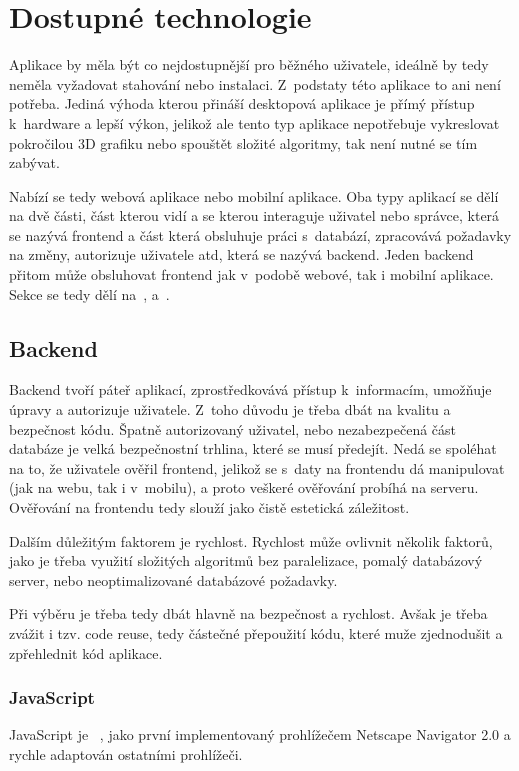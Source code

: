 \section{Dostupné technologie}
\label{sc:available_technologies}
Aplikace by měla být co nejdostupnější pro běžného uživatele, ideálně by tedy neměla vyžadovat stahování nebo instalaci. Z~podstaty této aplikace to ani není potřeba. Jediná výhoda kterou přináší desktopová aplikace je přímý přístup k~hardware a lepší výkon, jelikož ale tento typ aplikace nepotřebuje vykreslovat pokročilou 3D grafiku nebo spouštět složité algoritmy, tak není nutné se tím zabývat.

Nabízí se tedy webová aplikace nebo mobilní aplikace. Oba typy aplikací se dělí na dvě části, část kterou vidí a se kterou interaguje uživatel nebo správce, která se nazývá frontend a část která obsluhuje práci s~databází, zpracovává požadavky na změny, autorizuje uživatele atd, která se nazývá backend. Jeden backend přitom může obsluhovat frontend jak v~podobě webové, tak i mobilní aplikace. Sekce se tedy dělí na~,  a~.

\subsection{Backend}
\label{ss:backend}
Backend tvoří páteř aplikací, zprostředkovává přístup k~informacím, umožňuje úpravy a autorizuje uživatele. Z~toho důvodu je třeba dbát na kvalitu a bezpečnost kódu. Špatně autorizovaný uživatel, nebo nezabezpečená část databáze je velká bezpečnostní trhlina, které se musí předejít. Nedá se spoléhat na to, že uživatele ověřil frontend, jelikož se s~daty na frontendu dá manipulovat (jak na webu, tak i v~mobilu), a proto veškeré ověřování probíhá na serveru. Ověřování na frontendu tedy slouží jako čistě estetická záležitost.

Dalším důležitým faktorem je rychlost. Rychlost může ovlivnit několik faktorů, jako je třeba využití složitých algoritmů bez paralelizace, pomalý databázový server, nebo neoptimalizované databázové požadavky.

Při výběru je třeba tedy dbát hlavně na bezpečnost a rychlost. Avšak je třeba zvážit i tzv. code reuse, tedy částečné přepoužití kódu, které muže zjednodušit a zpřehlednit kód aplikace.

\subsubsection*{JavaScript}
JavaScript je \emph{}~\cite{netscapecommunicationscorporation_1995_press}, jako první implementovaný prohlížečem Netscape Navigator 2.0 a rychle adaptován ostatními prohlížeči.

